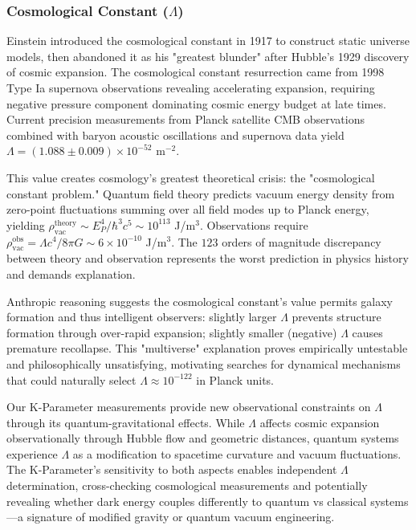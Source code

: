 \documentclass[11pt,a4paper,twoside]{article}
\begin{document}
\subsubsection{Cosmological Constant ($\Lambda$)}

Einstein introduced the cosmological constant in 1917 to construct static universe models, then abandoned it as his "greatest blunder" after Hubble's 1929 discovery of cosmic expansion. The cosmological constant resurrection came from 1998 Type Ia supernova observations revealing accelerating expansion, requiring negative pressure component dominating cosmic energy budget at late times. Current precision measurements from Planck satellite CMB observations combined with baryon acoustic oscillations and supernova data yield $\Lambda = (1.088 \pm 0.009) \times 10^{-52}$ m$^{-2}$.

This value creates cosmology's greatest theoretical crisis: the "cosmological constant problem." Quantum field theory predicts vacuum energy density from zero-point fluctuations summing over all field modes up to Planck energy, yielding $\rho_{\text{vac}}^{\text{theory}} \sim E_P^4 / \hbar^3 c^5 \sim 10^{113}$ J/m$^3$. Observations require $\rho_{\text{vac}}^{\text{obs}} = \Lambda c^4 / 8\pi G \sim 6 \times 10^{-10}$ J/m$^3$. The $123$ orders of magnitude discrepancy between theory and observation represents the worst prediction in physics history and demands explanation.

Anthropic reasoning suggests the cosmological constant's value permits galaxy formation and thus intelligent observers: slightly larger $\Lambda$ prevents structure formation through over-rapid expansion; slightly smaller (negative) $\Lambda$ causes premature recollapse. This "multiverse" explanation proves empirically untestable and philosophically unsatisfying, motivating searches for dynamical mechanisms that could naturally select $\Lambda \approx 10^{-122}$ in Planck units.

Our K-Parameter measurements provide new observational constraints on $\Lambda$ through its quantum-gravitational effects. While $\Lambda$ affects cosmic expansion observationally through Hubble flow and geometric distances, quantum systems experience $\Lambda$ as a modification to spacetime curvature and vacuum fluctuations. The K-Parameter's sensitivity to both aspects enables independent $\Lambda$ determination, cross-checking cosmological measurements and potentially revealing whether dark energy couples differently to quantum vs classical systems---a signature of modified gravity or quantum vacuum engineering.
\end{document}
